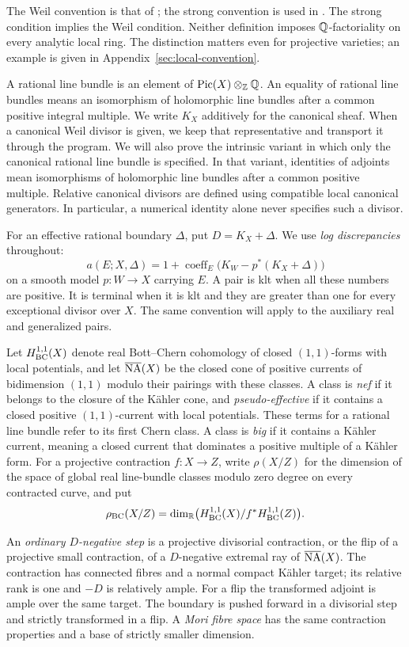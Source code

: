 The Weil convention is that of \cite[Definition~2.1]{DHY2023};
the strong convention is used in \cite[Section~2]{HX2026}.
The strong condition implies the Weil
condition. Neither definition imposes $\mathbb Q$-factoriality on every analytic
local ring. The distinction matters even for projective varieties; an
example is given in Appendix~\ref{sec:local-convention}.

A rational line bundle is an element of $\operatorname{Pic}(X)\otimes_{\mathbb Z}\mathbb Q$.
An equality of rational line bundles means an isomorphism of holomorphic
line bundles after a common positive integral multiple.
We write $K_X$ additively for the canonical sheaf. When a canonical Weil
divisor is given, we keep that representative and transport it through
the program. We will also prove the intrinsic variant in which only the
canonical rational line bundle is specified. In that variant, identities
of adjoints mean isomorphisms of holomorphic line bundles after a common
positive multiple. Relative canonical divisors are defined using
compatible local canonical generators. In particular, a numerical
identity alone never specifies such a divisor.

For an effective rational boundary $\Delta$, put $D=K_X+\Delta$.
We use \emph{log discrepancies} throughout:
\[
 a(E;X,\Delta)
 =1+\operatorname{coeff}_E\bigl(K_W-p^*(K_X+\Delta)\bigr)
\]
on a smooth model $p:W\to X$ carrying $E$. A pair is klt when all these
numbers are positive. It is terminal when it is klt and they are greater
than one for every exceptional divisor over $X$. The same convention
will apply to the auxiliary real and generalized pairs.

Let $H^{1,1}_{\mathrm{BC}}(X)$ denote real Bott--Chern cohomology of closed $(1,1)$-forms
with local potentials, and let $\overline{\mathrm{NA}}(X)$ be the closed cone of positive
currents of bidimension $(1,1)$ modulo their pairings with these classes.
A class is \emph{nef} if it belongs to the closure of the Kähler cone,
and \emph{pseudo-effective} if it contains a closed positive
$(1,1)$-current with local potentials. These terms for a rational line
bundle refer to its first Chern class. A class is \emph{big} if it
contains a Kähler current, meaning a closed current that dominates
a positive multiple of a Kähler form.
For a projective contraction
$f:X\to Z$, write $\rho(X/Z)$ for the dimension of the space of global
real line-bundle classes modulo zero degree on every contracted curve,
and put
\[
 \rho_{\mathrm{BC}}(X/Z)
 =\dim_{\mathbb R}\bigl(H^{1,1}_{\mathrm{BC}}(X)/f^*H^{1,1}_{\mathrm{BC}}(Z)\bigr).
\]

An \emph{ordinary $D$-negative step} is a projective divisorial
contraction, or the flip of a projective small contraction, of a
$D$-negative extremal ray of $\overline{\mathrm{NA}}(X)$. The contraction has connected
fibres and a normal compact Kähler target; its relative rank is one and
$-D$ is relatively ample. For a flip the transformed adjoint is ample
over the same target. The boundary is pushed forward in a divisorial
step and strictly transformed in a flip. A \emph{Mori fibre space} has
the same contraction properties and a base of strictly smaller
dimension.

